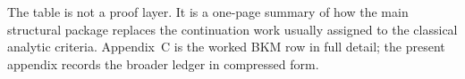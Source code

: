 \begin{remark}
The table is not a proof layer. It is a one-page summary of how the main structural package
replaces the continuation work usually assigned to the classical analytic criteria. Appendix~C is the
worked BKM row in full detail; the present appendix records the broader ledger in compressed form.
\end{remark}



\clearpage
